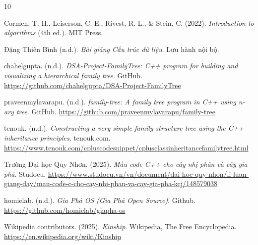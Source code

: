 \newpage
{}


\begin{thebibliography}{10}
	
	Cormen, T. H., Leiserson, C. E., Rivest, R. L., \& Stein, C. (2022). \textit{Introduction to algorithms} (4th ed.). MIT Press.
	
	Đặng Thiên Bình (n.d.). \textit{Bài giảng Cấu trúc dữ liệu}. Lưu hành nội bộ.
	
	chahelgupta. (n.d.). \textit{DSA-Project-FamilyTree: C++ program for building and visualizing a hierarchical family tree}. GitHub. \url{https://github.com/chahelgupta/DSA-Project-FamilyTree}
	
	praveenmylavarapu. (n.d.). \textit{family-tree: A family tree program in C++ using n-ary tree}. GitHub. \url{https://github.com/praveenmylavarapu/family-tree}
	
	tenouk. (n.d.). \textit{Constructing a very simple family structure tree using the C++ inheritance principles}. tenouk.com. \url{https://www.tenouk.com/cpluscodesnippet/cplusclassinheritancefamilytree.html}
	
	Trường Đại học Quy Nhơn. (2025). \textit{Mẫu code C++ cho cây nhị phân và cây gia phả}. Studocu. \url{https://www.studocu.vn/vn/document/dai-hoc-quy-nhon/li-luan-giang-day/mau-code-c-cho-cay-nhi-phan-va-cay-gia-pha-kcj/148579038}
	
	homielab. (n.d.). \textit{Gia Phả OS (Gia Phả Open Source)}. Github. \url{https://github.com/homielab/giapha-os}
	
	Wikipedia contributors. (2025). \textit{Kinship}. Wikipedia, The Free Encyclopedia. \url{https://en.wikipedia.org/wiki/Kinship}
	
\end{thebibliography}
